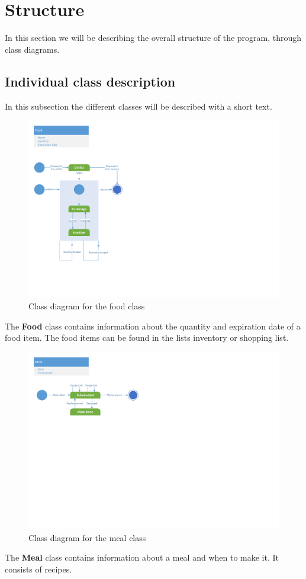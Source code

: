 \section{Structure}
In this section we will be describing the overall structure of the program, through class diagrams.

\subsection{Individual class description}
In this subsection the different classes will be described with a short text.

\begin{figure}[tbhp]
	\centering
	\includegraphics[clip=true, trim=0.5cm 4cm 18.5cm 0.5cm,  ]{Development/ProblemDomain/FoodClass.pdf}
	\caption{Class diagram for the food class} \label{FoodClass}
\end{figure}
The \textbf{Food} class contains information about the quantity and expiration date of a food item. The food items can be found in the lists inventory or shopping list.

\begin{figure}[H]
	\centering
	\includegraphics[clip=true, trim=0.5cm 13cm 16.5cm 0.5cm]{Development/ProblemDomain/MealClass.pdf}
	\caption{Class diagram for the meal class} \label{MealClass}
\end{figure}
The \textbf{Meal} class contains information about a meal and when to make it. It consists of recipes.

